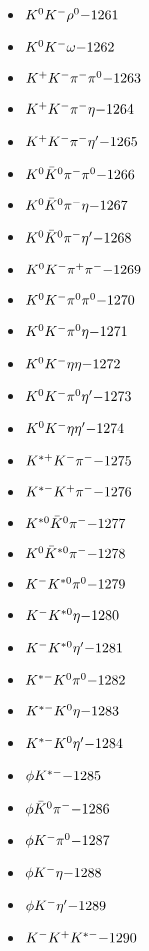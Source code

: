 \begin{multicols}{3}
\begin{itemize}
 \item $ K^{0} K^{-} \rho^{0} \hfill{-1261}$
 \item $ K^{0} K^{-} \omega \hfill{-1262}$
 \item $ K^{+} K^{-} \pi^{-} \pi^{0} \hfill{-1263}$
 \item $ K^{+} K^{-} \pi^{-} \eta \hfill{-1264}$
 \item $ K^{+} K^{-} \pi^{-} {\eta^{\prime}} \hfill{-1265}$
 \item $ K^{0} \bar{K}^{0} \pi^{-} \pi^{0} \hfill{-1266}$
 \item $ K^{0} \bar{K}^{0} \pi^{-} \eta \hfill{-1267}$
 \item $ K^{0} \bar{K}^{0} \pi^{-} {\eta^{\prime}} \hfill{-1268}$
 \item $ K^{0} K^{-} \pi^{+} \pi^{-} \hfill{-1269}$
 \item $ K^{0} K^{-} \pi^{0} \pi^{0} \hfill{-1270}$
 \item $ K^{0} K^{-} \pi^{0} \eta \hfill{-1271}$
 \item $ K^{0} K^{-} \eta \eta \hfill{-1272}$
 \item $ K^{0} K^{-} \pi^{0} {\eta^{\prime}} \hfill{-1273}$
 \item $ K^{0} K^{-} \eta {\eta^{\prime}} \hfill{-1274}$
 \item $ K^{*+} K^{-} \pi^{-} \hfill{-1275}$
 \item $ K^{*-} K^{+} \pi^{-} \hfill{-1276}$
 \item $ K^{*0} \bar{K}^{0} \pi^{-} \hfill{-1277}$
 \item $ K^{0} \bar{K}^{*0} \pi^{-} \hfill{-1278}$
 \item $ K^{-} K^{*0} \pi^{0} \hfill{-1279}$
 \item $ K^{-} K^{*0} \eta \hfill{-1280}$
 \item $ K^{-} K^{*0} {\eta^{\prime}} \hfill{-1281}$
 \item $ K^{*-} K^{0} \pi^{0} \hfill{-1282}$
 \item $ K^{*-} K^{0} \eta \hfill{-1283}$
 \item $ K^{*-} K^{0} {\eta^{\prime}} \hfill{-1284}$
 \item $ \phi K^{*-} \hfill{-1285}$
 \item $ \phi \bar{K}^{0} \pi^{-} \hfill{-1286}$
 \item $ \phi K^{-} \pi^{0} \hfill{-1287}$
 \item $ \phi K^{-} \eta \hfill{-1288}$
 \item $ \phi K^{-} {\eta^{\prime}} \hfill{-1289}$
 \item $ K^{-} K^{+} K^{*-} \hfill{-1290}$

\end{itemize}
\end{multicols}
